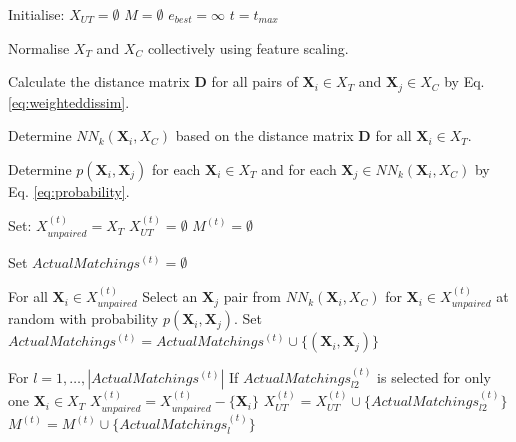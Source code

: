 		\begin{algorithm}
			\label{alg:wnnsa}
													
			Initialise:
			\linebreak
			\text{\quad}
			$X_{UT}=\emptyset$
			\linebreak
			\text{\quad}
			$M=\emptyset$
			\linebreak
			\text{\quad}
			$e_{best}=\infty$
			\linebreak
			\text{\quad}
			$t=t_{max}$
													
			Normalise $X_T$ and $X_C$ collectively using feature scaling.
													
			Calculate the distance matrix $\textbf{D}$ for all pairs of $\textbf{X}_i \in X_T$ and $\textbf{X}_j \in X_C$ by Eq. \ref{eq:weighteddissim}.
													
			Determine $NN_k(\textbf{X}_i, X_C)$ based on the distance matrix $\textbf{D}$ for all $\textbf{X}_i \in X_T$. 
													
			Determine $p(\textbf{X}_i,\textbf{X}_j)$ for each $\textbf{X}_i \in X_T$ and for each $\textbf{X}_j \in NN_k(\textbf{X}_i, X_C)$ by Eq. \ref{eq:probability}.
													
			Set:
			\linebreak
			\text{\quad}
			$X_{unpaired}^{(t)}=X_T$
			\linebreak
			\text{\quad}
			$X_{UT}^{(t)}=\emptyset$
			\linebreak
			\text{\quad}
			$M^{(t)}=\emptyset$
													
			Set $ActualMatchings^{(t)}=\emptyset$
													
			For all $\textbf{X}_i \in X_{unpaired}^{(t)}$
			\linebreak
			\text{\quad} Select an $\textbf{X}_j$ pair from $NN_k(\textbf{X}_i, X_C)$ for $\textbf{X}_i \in X_{unpaired}^{(t)}$
			at random with probability $p(\textbf{X}_i,\textbf{X}_j)$.
			\linebreak
			\text{\quad}
			Set $ActualMatchings^{(t)} = ActualMatchings^{(t)} \cup \{(\textbf{X}_i,\textbf{X}_j)\}$ 
													
			For $l=1, \dots, |ActualMatchings^{(t)}|$
			\linebreak
			\text{\quad}
			If $ActualMatchings_{l2}^{(t)}$ is selected for only one $\textbf{X}_i \in X_T$
			\linebreak
			\text{\quad}\text{\quad}
			$X_{unpaired}^{(t)}=X_{unpaired}^{(t)}-\{\textbf{X}_i\}$
			\linebreak
			\text{\quad}\text{\quad}
			$X_{UT}^{(t)}=X_{UT}^{(t)} \cup \{ActualMatchings_{l2}^{(t)}\}$
			\linebreak
			\text{\quad}\text{\quad}
			$M^{(t)}=M^{(t)} \cup \{ActualMatchings_{l}^{(t)}\}$
													

\end{algorithm}
